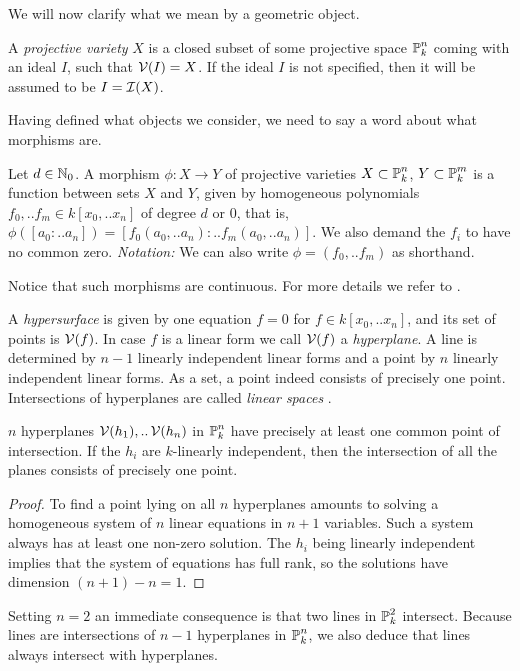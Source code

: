 We will now clarify what we mean by a geometric object.
\begin{definition}
A \emph{projective variety} $X$ is a closed subset of some projective space $\operatorname{\mathbb P}^n_k$ coming with an ideal $I$, such that $\operatorname{\mathcal V}(I) = X$.
If the ideal $I$ is not specified, then it will be assumed to be $I=\operatorname{\mathcal I}(X)$.
\end{definition}
Having defined what objects we consider, we need to say a word about what morphisms are.
\begin{definition}
Let $d \in \operatorname{\mathbb N_0}$.
A morphism $\phi : X \to Y$ of projective varieties $X \subset \operatorname{\mathbb P}^n_k$, $Y \subset \operatorname{\mathbb P}^m_k$ is a function between sets $X$ and $Y$,
given by homogeneous polynomials $f_0,..f_m \in k[x_0,..x_n]$ of degree $d$ or 0, that is, $\phi([a_0:..a_n]) = [f_0(a_0,..a_n):..f_m(a_0,..a_n)]$.
We also demand the $f_i$ to have no common zero. \emph{Notation:} We can also write $\phi = (f_0,..f_m)$ as shorthand.
\end{definition}
Notice that such morphisms are continuous.
For more details we refer to \cite[part I, lecture 1]{harris1992algebraic}.

\begin{example}
A \emph{hypersurface} is given by one equation $f=0$ for $f\in k[x_0,..x_n]$, and its set of points is $\operatorname{\mathcal V}(f)$.
In case $f$ is a linear form we call $\operatorname{\mathcal V}(f)$ a \emph{hyperplane}.
A line is determined by $n-1$ linearly independent linear forms and a point by $n$ linearly independent linear forms.
As a set, a point indeed consists of precisely one point.
Intersections of hyperplanes are called \emph{linear spaces} \cite[example 1.1]{harris1992algebraic}.
\end{example}

\begin{proposition} $n$ hyperplanes $\operatorname{\mathcal V}(h_1),..\operatorname{\mathcal V}(h_n)$ in $\operatorname{\mathbb P}^n_k$ have precisely at least one common point of intersection.
If the $h_i$ are $k$-linearly independent, then the intersection of all the planes consists of precisely one point.
\end{proposition}
\begin{proof}
To find a point lying on all $n$ hyperplanes amounts to solving a homogeneous system of $n$ linear equations in $n+1$ variables.
Such a system always has at least one non-zero solution.
The $h_i$ being linearly independent implies that the system of equations has full rank, so the solutions have dimension $(n+1) - n = 1$.
\end{proof}

\begin{corollary} \label{corollarySimpleIntersect}
Setting $n=2$ an immediate consequence is that two lines in $\operatorname{\mathbb P}^2_k$ intersect.
Because lines are intersections of $n-1$ hyperplanes in $\operatorname{\mathbb P}^n_k$, we also deduce that lines always intersect with hyperplanes.
\hfill\qedsymbol
\end{corollary}

